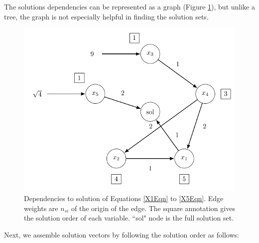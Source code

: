 \documentclass[letterpaper]{article}
\begin{document}
The solutions dependencies can be represented as a graph (Figure \ref{graphFig}), but unlike a tree,
the graph is not especially helpful in finding the solution sets.

\begin{figure}\centering
\includegraphics[width=0.5\linewidth]{solutionGraph.png}
\caption{Dependencies to solution of Equations \ref{X1Eqn} to \ref{X5Eqn}.   Edge weights are
         $n_{si}$ of the origin of the edge.  The square annotation gives the solution order of each variable.
         ``sol" node is the full solution set. }\label{graphFig}
\end{figure}

 Next, we assemble solution vectors by following the solution order as follows:
\end{document}
